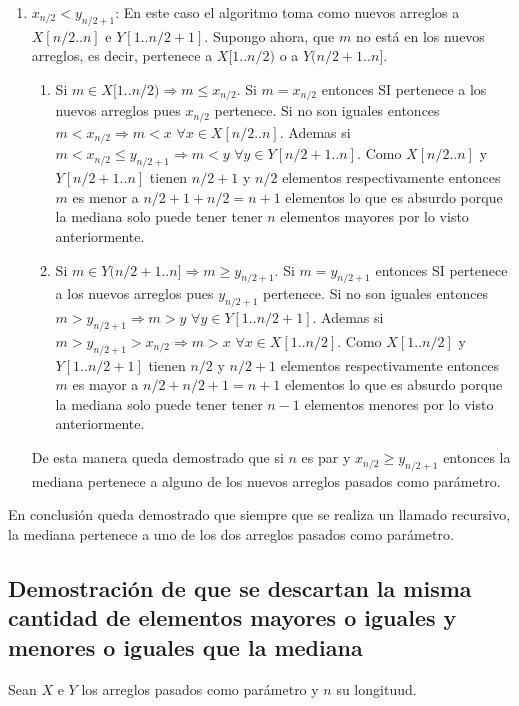 \documentclass[a4paper,11pt] {article}
\begin{document}
\begin{enumerate}
\begin{enumerate}
\item $x_{n/2}<y_{n/2+1}$:
En este caso el algoritmo toma como nuevos arreglos a $X[n/2..n]$ e $Y[1..n/2+1]$. Supongo ahora, que $m$ no est\'a en los nuevos arreglos, es decir, pertenece a $X[1..n/2)$ o a $Y(n/2+1..n]$. 
\begin{enumerate}
\item
 Si $m \in X[1..n/2) \Longrightarrow m \leq x_{n/2}$. Si $m=x_{n/2}$ entonces SI pertenece a los nuevos arreglos pues $x_{n/2}$ pertenece. Si no son iguales entonces $m<x_{n/2} \Longrightarrow m<x \,\,\forall x \in X[n/2..n]$. Ademas si $m<x_{n/2}\leq y_{n/2+1} \Longrightarrow m<y \,\,\forall y \in Y[n/2+1..n]$. Como $X[n/2..n]$ y $Y[n/2+1..n]$ tienen $n/2+1$ y $n/2$ elementos respectivamente entonces $m$ es menor a $n/2+1+n/2=n+1$ elementos lo que es absurdo porque la mediana solo puede tener tener $n$ elementos mayores por lo visto anteriormente.
\item
  Si $m \in Y(n/2+1..n]\Longrightarrow m \geq y_{n/2+1}$. Si $m=y_{n/2+1}$ entonces SI pertenece a los nuevos arreglos pues $y_{n/2+1}$ pertenece. Si no son iguales entonces $m>y_{n/2+1} \Longrightarrow m>y \,\,\forall y \in Y[1..n/2+1]$. Ademas si $m>y_{n/2+1}> x_{n/2} \Longrightarrow m>x \,\,\forall x \in X[1..n/2]$. Como $X[1..n/2]$ y $Y[1..n/2+1]$ tienen $n/2$ y $n/2+1$ elementos respectivamente entonces $m$ es mayor a $n/2+n/2+1=n+1$ elementos lo que es absurdo porque la mediana solo puede tener tener $n-1$ elementos menores por lo visto anteriormente.
\end{enumerate}

De esta manera queda demostrado que si $n$ es par y $x_{n/2}\geq y_{n/2+1}$ entonces la mediana pertenece a alguno de los nuevos arreglos pasados como par\'ametro.

\end{enumerate}

\end{enumerate}

En conclusi\'on queda demostrado que siempre que se realiza un llamado recursivo, la mediana pertenece a uno de los dos arreglos pasados como par\'ametro.


\subsection*{Demostraci\'on de que se descartan la misma cantidad de elementos mayores o iguales y menores o iguales que la mediana}

Sean $X$ e $Y$ los arreglos pasados como par\'ametro y $n$ su longituud.
\end{document}
